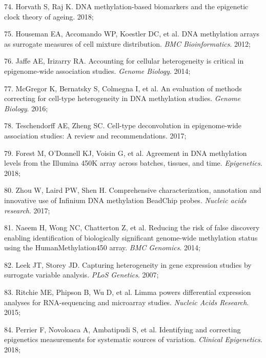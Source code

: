 \documentclass[11pt,oneside]{bristolthesis}
\newenvironment{cslreferences}%
  {}%
  {\par}
\begin{document}
\begin{cslreferences}
\leavevmode\hypertarget{ref-Horvath2018}{}%
74. Horvath S, Raj K. DNA methylation-based biomarkers and the epigenetic clock theory of ageing. 2018;

\leavevmode\hypertarget{ref-Houseman2012}{}%
75. Houseman EA, Accomando WP, Koestler DC, et al. DNA methylation arrays as surrogate measures of cell mixture distribution. \emph{BMC Bioinformatics}. 2012;

\leavevmode\hypertarget{ref-Jaffe2014}{}%
76. Jaffe AE, Irizarry RA. Accounting for cellular heterogeneity is critical in epigenome-wide association studies. \emph{Genome Biology}. 2014;

\leavevmode\hypertarget{ref-McGregor2016}{}%
77. McGregor K, Bernatsky S, Colmegna I, et al. An evaluation of methods correcting for cell-type heterogeneity in DNA methylation studies. \emph{Genome Biology}. 2016;

\leavevmode\hypertarget{ref-Teschendorff2017}{}%
78. Teschendorff AE, Zheng SC. Cell-type deconvolution in epigenome-wide association studies: A review and recommendations. 2017;

\leavevmode\hypertarget{ref-Forest2018}{}%
79. Forest M, O'Donnell KJ, Voisin G, et al. Agreement in DNA methylation levels from the Illumina 450K array across batches, tissues, and time. \emph{Epigenetics}. 2018;

\leavevmode\hypertarget{ref-Zhou2017}{}%
80. Zhou W, Laird PW, Shen H. Comprehensive characterization, annotation and innovative use of Infinium DNA methylation BeadChip probes. \emph{Nucleic acids research}. 2017;

\leavevmode\hypertarget{ref-Naeem2014}{}%
81. Naeem H, Wong NC, Chatterton Z, et al. Reducing the risk of false discovery enabling identification of biologically significant genome-wide methylation status using the HumanMethylation450 array. \emph{BMC Genomics}. 2014;

\leavevmode\hypertarget{ref-Leek2007}{}%
82. Leek JT, Storey JD. Capturing heterogeneity in gene expression studies by surrogate variable analysis. \emph{PLoS Genetics}. 2007;

\leavevmode\hypertarget{ref-Ritchie2015}{}%
83. Ritchie ME, Phipson B, Wu D, et al. Limma powers differential expression analyses for RNA-sequencing and microarray studies. \emph{Nucleic Acids Research}. 2015;

\leavevmode\hypertarget{ref-Perrier2018}{}%
84. Perrier F, Novoloaca A, Ambatipudi S, et al. Identifying and correcting epigenetics measurements for systematic sources of variation. \emph{Clinical Epigenetics}. 2018;


\end{cslreferences}
\end{document}
